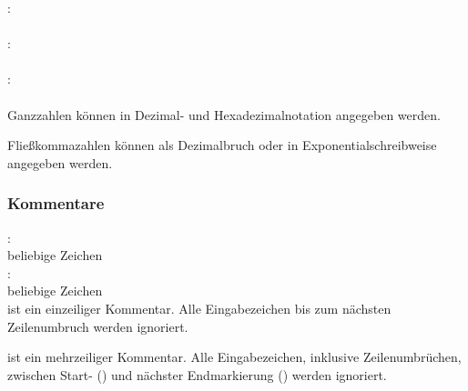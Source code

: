 :\label{Digits_Hex}\\
\hspace*{1cm}\Gspace{}\\
:\label{Num_Hex}\\
\hspace*{1cm}\Gspace{}\\
:\label{NUMERIC}\\
\hspace*{1cm}\\

Ganzzahlen können in Dezimal- und Hexadezimalnotation angegeben werden.

Fließkommazahlen können als Dezimalbruch oder in Exponentialschreibweise
angegeben werden.


\subsubsection{Kommentare}\label{Kommentare}
:\label{COMMENT}\\
\hspace*{1cm}\Gt{//} beliebige Zeichen \Gspace{}\\
:\label{ML_COMMENT}\\
\hspace*{1cm}\Gt{\kwMlcStart} beliebige Zeichen \Gt{\kwMlcEnd}\\

 ist ein einzeiliger Kommentar. Alle Eingabezeichen bis zum nächsten Zeilenumbruch
werden ignoriert.

 ist ein mehrzeiliger Kommentar. Alle Eingabezeichen, inklusive Zeilenumbrüchen,
zwischen Start- (\kwMlcStart) und nächster Endmarkierung (\kwMlcEnd) werden ignoriert.

